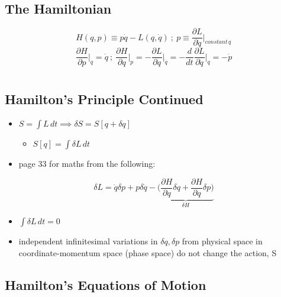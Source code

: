 \documentclass[a4paper,11pt,normalem]{article}
\begin{document}
\subsection{The Hamiltonian}\label{the-hamiltonian}

\[
    H(q, p) \equiv p\dot{q} - L(q,\dot{q}) ~;~ p \equiv \frac{\partial L}{\partial \dot{q}}\Bigg|_{constant\, q_{}} \]
\[
    \frac{\partial H}{\partial p}\Bigg|_{q} = \dot{q} ~;~ \frac{\partial H}{\partial q}\Bigg|_{p} = -\frac{\partial L}{\partial q}\Bigg|_{\dot{q}} = -\frac{d}{dt}\frac{\partial L}{\partial \dot{q}}\Bigg|_{q} = -\dot{p}
\]

\section{}\label{lecture-11}

\subsection{Hamilton's Principle Continued}\label{hamiltons-principle-continued}

\begin{itemize}
\item
  \(S = \int L\,dt \implies \delta S = S[q + \delta q]\)
  \begin{itemize}
  \item
    \(S[q] = \int \delta L\,dt\)
  \end{itemize}
\item
  page 33 for maths from the following:
\end{itemize}

\[
    \delta L = \dot{q}\delta p + p\delta\dot{q} - \underbrace{\Big(\frac{\partial H}{\partial q}\delta q + \frac{\partial H}{\partial q}\delta p\Big)}_{\delta H}
\]

\begin{itemize}
\item
  \(\int \delta L\,dt = 0\)
\item
  independent infinitesimal variations in \(\delta q, \delta p\) from
  physical space in coordinate-momentum space (phase space) do not
  change the action, S
\end{itemize}

\subsection{Hamilton's Equations of Motion}\label{hamiltons-equations-of-motion}
\end{document}
